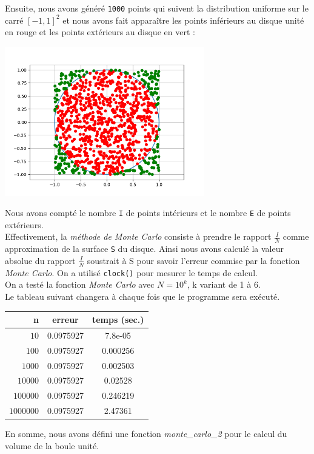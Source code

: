 \documentclass{article}
\begin{document}
\begin{enumerate}
Ensuite, nous avons généré \texttt{1000} points qui suivent la distribution uniforme sur le carré $[-1,1]^2$ et nous avons fait apparaître les points inférieurs au disque unité en rouge et les points extérieurs au disque en vert :

\begin{center}
    \includegraphics[width=0.65\textwidth]{cercleexo6.png}
\end{center}

Nous avons compté le nombre \texttt{I} de points intérieurs et le nombre \texttt{E} de points extérieurs. \\ 

	Effectivement, la \textit{méthode de Monte Carlo} consiste à prendre le rapport $\frac{I}{N}$ comme approximation de la surface \texttt{S} du disque. Ainsi nous avons calculé la valeur absolue du rapport $\frac{I}{N}$ soustrait à S pour savoir l'erreur commise par la fonction \textit{Monte Carlo}. On a utilisé \texttt{clock()} pour mesurer le temps de calcul.
\\

	On a testé la fonction \textit{Monte Carlo} avec $N=10^k$, k variant de 1 à 6.\\

	Le tableau suivant changera à chaque fois que le programme sera exécuté.\\

\begin{center}
\begin{tabular}{r | c | c}
{n} & erreur & temps (sec.)\\
\hline
$10$ & {0.0975927} & {7.8e-05}\\
$100$ & {0.0975927 } & {0.000256}\\
$1000$ & {0.0975927} & {0.002503}\\
$10000$ & {0.0975927} & {0.02528}\\
$100000$ & {0.0975927} & {0.246219}\\
$1000000$ & {0.0975927} & {2.47361}
\end{tabular}
\end{center}

En somme, nous avons défini une fonction \textit{monte\_carlo\_2} pour le calcul du volume de la boule unité.  



\end{enumerate}
\end{document}
